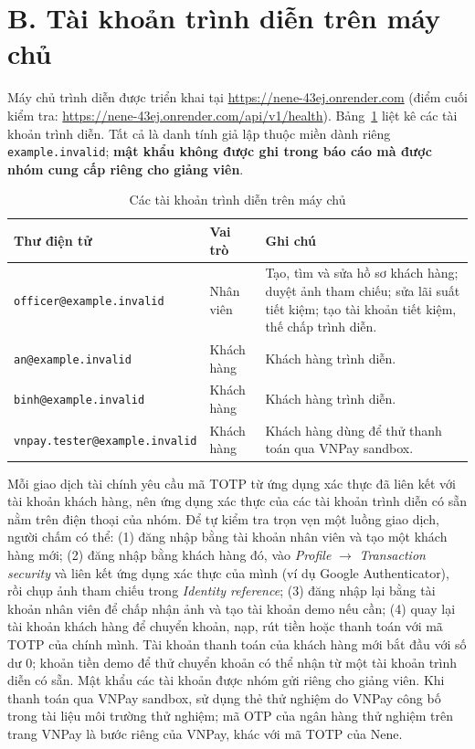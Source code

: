 \section*{B. Tài khoản trình diễn trên máy chủ}
{}

Máy chủ trình diễn được triển khai tại \url{https://nene-43ej.onrender.com} (điểm cuối kiểm tra: \url{https://nene-43ej.onrender.com/api/v1/health}). Bảng~\ref{tab:pl-tai-khoan} liệt kê các tài khoản trình diễn. Tất cả là danh tính giả lập thuộc miền dành riêng \texttt{example.\allowbreak{}invalid}; \textbf{mật khẩu không được ghi trong báo cáo mà được nhóm cung cấp riêng cho giảng viên}.

\begin{table}[H]
	\centering
	\caption{Các tài khoản trình diễn trên máy chủ}
	\label{tab:pl-tai-khoan}
	\linespread{1.15}\small
	\begin{tabularx}{\textwidth}{@{}p{5.4cm} p{2.4cm} X@{}}
		\toprule
		\textbf{Thư điện tử} & \textbf{Vai trò} & \textbf{Ghi chú} \\
		\midrule
		\texttt{officer@example.\allowbreak{}invalid} & Nhân viên & Tạo, tìm và sửa hồ sơ khách hàng; duyệt ảnh tham chiếu; sửa lãi suất tiết kiệm; tạo tài khoản tiết kiệm, thế chấp trình diễn. \\
		\midrule
		\texttt{an@example.\allowbreak{}invalid} & Khách hàng & Khách hàng trình diễn. \\
		\midrule
		\texttt{binh@example.\allowbreak{}invalid} & Khách hàng & Khách hàng trình diễn. \\
		\midrule
		\texttt{vnpay.\allowbreak{}tester@example.\allowbreak{}invalid} & Khách hàng & Khách hàng dùng để thử thanh toán qua VNPay sandbox. \\
		\bottomrule
	\end{tabularx}
\end{table}

Mỗi giao dịch tài chính yêu cầu mã TOTP từ ứng dụng xác thực đã liên kết với tài khoản khách hàng, nên ứng dụng xác thực của các tài khoản trình diễn có sẵn nằm trên điện thoại của nhóm. Để tự kiểm tra trọn vẹn một luồng giao dịch, người chấm có thể: (1) đăng nhập bằng tài khoản nhân viên và tạo một khách hàng mới; (2) đăng nhập bằng khách hàng đó, vào \textit{Profile} $\rightarrow$ \textit{Transaction security} và liên kết ứng dụng xác thực của mình (ví dụ Google Authenticator), rồi chụp ảnh tham chiếu trong \textit{Identity reference}; (3) đăng nhập lại bằng tài khoản nhân viên để chấp nhận ảnh và tạo tài khoản demo nếu cần; (4) quay lại tài khoản khách hàng để chuyển khoản, nạp, rút tiền hoặc thanh toán với mã TOTP của chính mình. Tài khoản thanh toán của khách hàng mới bắt đầu với số dư 0; khoản tiền demo để thử chuyển khoản có thể nhận từ một tài khoản trình diễn có sẵn. Mật khẩu các tài khoản được nhóm gửi riêng cho giảng viên. Khi thanh toán qua VNPay sandbox, sử dụng thẻ thử nghiệm do VNPay công bố trong tài liệu môi trường thử nghiệm; mã OTP của ngân hàng thử nghiệm trên trang VNPay là bước riêng của VNPay, khác với mã TOTP của Nene.

